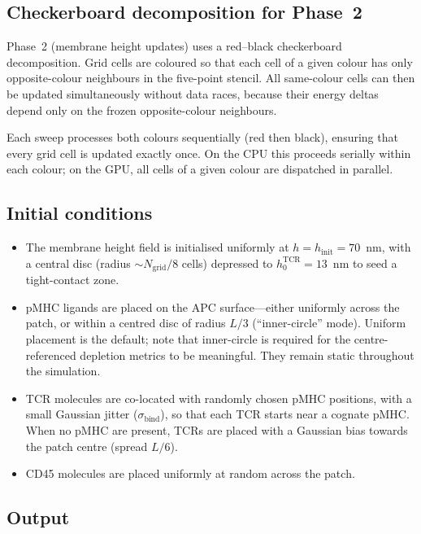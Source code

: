 \documentclass[11pt,a4paper]{article}
\begin{document}
\subsection{Checkerboard decomposition for Phase~2}

Phase~2 (membrane height updates) uses a red--black checkerboard
decomposition.  Grid cells are coloured so that each cell of a given
colour has only opposite-colour neighbours in the five-point stencil.
All same-colour cells can then be updated simultaneously without data
races, because their energy deltas depend only on the frozen
opposite-colour neighbours.

Each sweep processes both colours sequentially (red then black),
ensuring that every grid cell is updated exactly once.  On the CPU
this proceeds serially within each colour; on the GPU, all cells of a
given colour are dispatched in parallel.


\subsection{Initial conditions}

\begin{itemize}
  \item The membrane height field is initialised uniformly at
    $h = h_\text{init} = 70$~nm, with a central disc
    (radius $\sim N_\text{grid}/8$ cells) depressed to
    $h_0^\text{TCR}=13$~nm to seed a tight-contact zone.
  \item pMHC ligands are placed on the APC surface---either uniformly
    across the patch, or within a centred disc of radius $L/3$
    (``inner-circle'' mode).  Uniform placement is the default; note that
    inner-circle is required for the centre-referenced depletion metrics to be
    meaningful.  They remain static throughout
    the simulation.
  \item TCR molecules are co-located with randomly chosen pMHC
    positions, with a small Gaussian jitter ($\sigma_\text{bind}$),
    so that each TCR starts near a cognate pMHC.  When no pMHC are
    present, TCRs are placed with a Gaussian bias towards the patch
    centre (spread $L/6$).
  \item CD45 molecules are placed uniformly at random across the
    patch.
\end{itemize}


\subsection{Output}
\end{document}

